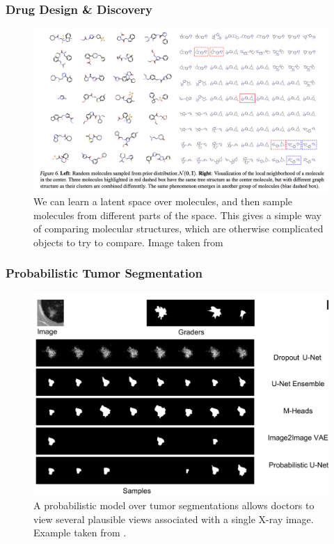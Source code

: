 \documentclass[10pt,mathserif]{beamer}
\begin{document}
\begin{frame}
  \frametitle{Drug Design \& Discovery}
\begin{figure}[ht]
  \centering
  \includegraphics[width=0.6\paperwidth]{figure/vae_molecule}
  \caption{We can learn a latent space over molecules, and then sample molecules
    from different parts of the space. This gives a simple way of comparing
    molecular structures, which are otherwise complicated objects to try to
    compare. Image taken from \citep{jin2018junction}}
\end{figure}
\end{frame}

\begin{frame}
  \frametitle{Probabilistic Tumor Segmentation}
\begin{figure}[ht]
  \centering
  \includegraphics[width=0.6\paperwidth]{figure/vae_unet}
  \caption{A probabilistic model over tumor segmentations allows doctors to view
    several plausible views associated with a single X-ray
    image. Example taken from
    \citep{kohl2018probabilistic}. \label{fig:vae_unet} }
\end{figure}
\end{frame}
\end{document}
